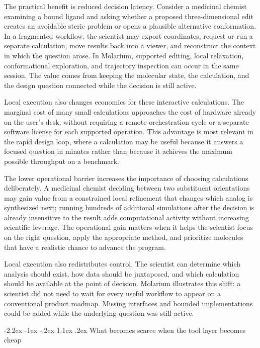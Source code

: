 \documentclass[11pt]{article}
\makeatletter
\renewcommand\section{\@startsection{section}{1}{\z@}%
  {-2.2ex \@plus -1ex \@minus -.2ex}%
  {1.1ex \@plus .2ex}%
  {\normalfont\Large\bfseries\color{molblue}}}
\makeatother
\begin{document}
The practical benefit is reduced decision latency. Consider a medicinal chemist examining a bound ligand and asking whether a proposed three-dimensional edit creates an avoidable steric problem or opens a plausible alternative conformation. In a fragmented workflow, the scientist may export coordinates, request or run a separate calculation, move results back into a viewer, and reconstruct the context in which the question arose. In Molarium, supported editing, local relaxation, conformational exploration, and trajectory inspection can occur in the same session. The value comes from keeping the molecular state, the calculation, and the design question connected while the decision is still active.

Local execution also changes economics for these interactive calculations. The marginal cost of many small calculations approaches the cost of hardware already on the user's desk, without requiring a remote orchestration cycle or a separate software license for each supported operation. This advantage is most relevant in the rapid design loop, where a calculation may be useful because it answers a focused question in minutes rather than because it achieves the maximum possible throughput on a benchmark.

The lower operational barrier increases the importance of choosing calculations deliberately. A medicinal chemist deciding between two substituent orientations may gain value from a constrained local refinement that changes which analog is synthesized next; running hundreds of additional simulations after the decision is already insensitive to the result adds computational activity without increasing scientific leverage. The operational gain matters when it helps the scientist focus on the right question, apply the appropriate method, and prioritize molecules that have a realistic chance to advance the program.

Local execution also redistributes control. The scientist can determine which analysis should exist, how data should be juxtaposed, and which calculation should be available at the point of decision. Molarium illustrates this shift: a scientist did not need to wait for every useful workflow to appear on a conventional product roadmap. Missing interfaces and bounded implementations could be added while the underlying question was still active.

\section{What becomes scarce when the tool layer becomes cheap}
\end{document}
